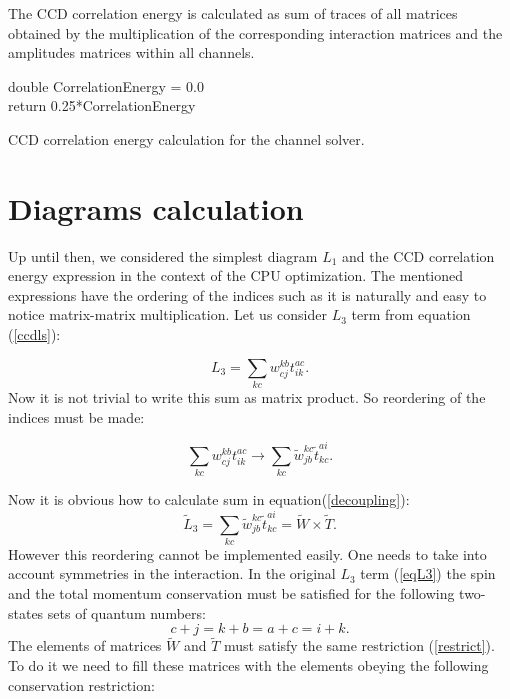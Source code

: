 \documentclass[twoside,english]{uiofysmaster}
\begin{document}
The CCD correlation energy is calculated as sum of traces of all matrices obtained by the multiplication of the corresponding interaction matrices and the amplitudes matrices within all channels. 
\IncMargin{1em}
\begin{algorithm}[h!]
	\SetAlgoLined
	
	\BlankLine
	double CorrelationEnergy = 0.0 \\
	return 0.25*CorrelationEnergy
	\caption{CCD correlation energy calculation for the channel solver.}\label{CCCorrChannels}
\end{algorithm}\DecMargin{1em}


\section{Diagrams calculation}\label{sectiondiagcalc}

Up until then, we considered the simplest diagram $L_1$ and the CCD correlation energy expression in the context of the CPU optimization. The mentioned expressions have the ordering of the indices such as it is naturally and easy to notice matrix-matrix multiplication.
Let us consider $L_3$ term from equation (\ref{ccdls}):

\begin{equation}\label{eqL3}
L_3 = \sum\limits_{kc}w_{cj}^{kb}t_{ik}^{ac}.
\end{equation}
Now it is not trivial to write this sum as matrix product. So reordering of the indices must be made:

\begin{equation}\label{decoupling}
\sum\limits_{kc}w_{cj}^{kb}t_{ik}^{ac} \rightarrow \sum\limits_{kc}\tilde{w}_{jb}^{kc}\tilde{t}_{kc}^{ai}.
\end{equation}

Now it is obvious how to calculate sum in equation(\ref{decoupling}):
\begin{equation}
\tilde{L}_3 = \sum\limits_{kc}\tilde{w}_{jb}^{kc}\tilde{t}_{kc}^{ai} = \tilde{W}\times\tilde{T}.
\end{equation}
However this reordering cannot be implemented easily. One needs to take into account symmetries in the interaction. In the original $L_3$ term (\ref{eqL3}) the spin and the total momentum conservation must be satisfied for the following two-states sets of quantum numbers:
\begin{equation}\label{restrict}
c + j = k + b = a + c = i + k.
\end{equation}
The elements of matrices $\tilde{W}$ and $\tilde{T}$ must satisfy the same restriction (\ref{restrict}). To do it we need to fill these matrices with the elements obeying the following conservation restriction: 
\end{document}
